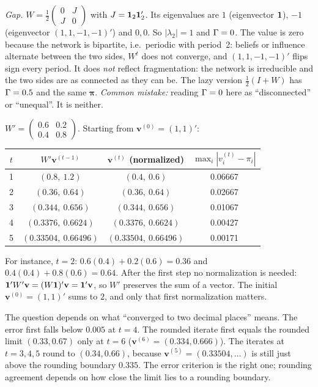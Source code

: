 \documentclass[../solutions_manual.tex]{subfiles}
\begin{document}
\emph{Gap.} $W = \frac12\begin{pmatrix} 0 & J \\ J & 0\end{pmatrix}$ with $J = \mathbf{1}_2\mathbf{1}_2'$. Its eigenvalues are $1$ (eigenvector $\mathbf{1}$), $-1$ (eigenvector $(1,1,-1,-1)'$) and $0, 0$. So $|\lambda_2| = 1$ and $\Gamma = 0$. The value is zero because the network is bipartite, i.e.\ periodic with period~2: beliefs or influence alternate between the two sides, $W^t$ does not converge, and $(1,1,-1,-1)'$ flips sign every period. It does \emph{not} reflect fragmentation: the network is irreducible and the two sides are as connected as they can be. The lazy version $\frac12(I + W)$ has $\Gamma = 0.5$ and the same $\boldsymbol{\pi}$. \emph{Common mistake:} reading $\Gamma = 0$ here as ``disconnected'' or ``unequal''. It is neither.


 $W' = \begin{pmatrix} 0.6 & 0.2 \\ 0.4 & 0.8\end{pmatrix}$. Starting from $\mathbf{v}^{(0)} = (1,1)'$:
\begin{center}
\begin{tabular}{cccc}
\toprule
$t$ & $W'\mathbf{v}^{(t-1)}$ & $\mathbf{v}^{(t)}$ (normalized) & $\max_i|v_i^{(t)} - \pi_i|$ \\
\midrule
1 & $(0.8,\ 1.2)$ & $(0.4,\ 0.6)$ & 0.06667 \\
2 & $(0.36,\ 0.64)$ & $(0.36,\ 0.64)$ & 0.02667 \\
3 & $(0.344,\ 0.656)$ & $(0.344,\ 0.656)$ & 0.01067 \\
4 & $(0.3376,\ 0.6624)$ & $(0.3376,\ 0.6624)$ & 0.00427 \\
5 & $(0.33504,\ 0.66496)$ & $(0.33504,\ 0.66496)$ & 0.00171 \\
\bottomrule
\end{tabular}
\end{center}
For instance, $t = 2$: $0.6(0.4) + 0.2(0.6) = 0.36$ and $0.4(0.4) + 0.8(0.6) = 0.64$. After the first step no normalization is needed: $\mathbf{1}'W'\mathbf{v} = (W\mathbf{1})'\mathbf{v} = \mathbf{1}'\mathbf{v}$, so $W'$ preserves the sum of a vector. The initial $\mathbf{v}^{(0)} = (1,1)'$ sums to $2$, and only that first normalization matters.

 The question depends on what ``converged to two decimal places'' means. The error first falls below $0.005$ at $t = 4$. The rounded iterate first equals the rounded limit $(0.33, 0.67)$ only at $t = 6$ ($\mathbf{v}^{(6)} = (0.334, 0.666)$). The iterates at $t = 3, 4, 5$ round to $(0.34, 0.66)$, because $\mathbf{v}^{(5)} = (0.33504, \ldots)$ is still just above the rounding boundary $0.335$. The error criterion is the right one; rounding agreement depends on how close the limit lies to a rounding boundary.
\end{document}
